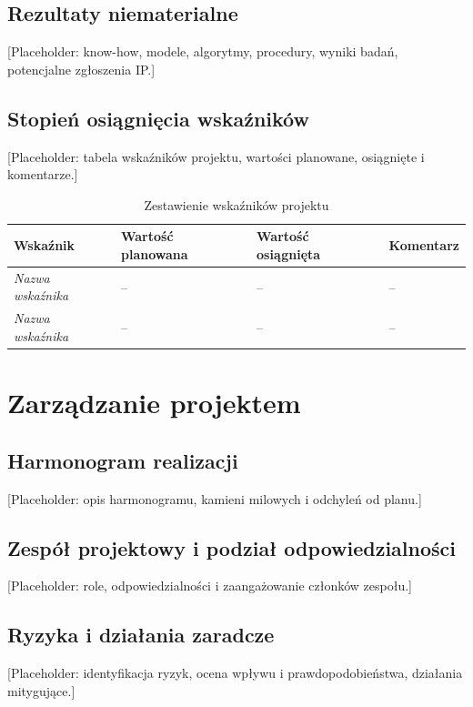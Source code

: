 \documentclass[12pt,a4paper]{report}
\begin{document}
\section{Rezultaty niematerialne}
[Placeholder: know-how, modele, algorytmy, procedury, wyniki badań, potencjalne zgłoszenia IP.]

\section{Stopień osiągnięcia wskaźników}
[Placeholder: tabela wskaźników projektu, wartości planowane, osiągnięte i komentarze.]

\begin{table}[h]
    \centering
    \caption{Zestawienie wskaźników projektu}
    \begin{tabular}{p{} p{} p{} p{}}
        \toprule
        Wskaźnik & Wartość planowana & Wartość osiągnięta & Komentarz \\
        \midrule
        \textit{Nazwa wskaźnika} & -- & -- & -- \\
        \textit{Nazwa wskaźnika} & -- & -- & -- \\
        \bottomrule
    \end{tabular}
\end{table}

\chapter{Zarządzanie projektem}
\section{Harmonogram realizacji}
[Placeholder: opis harmonogramu, kamieni milowych i odchyleń od planu.]

\section{Zespół projektowy i podział odpowiedzialności}
[Placeholder: role, odpowiedzialności i zaangażowanie członków zespołu.]

\section{Ryzyka i działania zaradcze}
[Placeholder: identyfikacja ryzyk, ocena wpływu i prawdopodobieństwa, działania mitygujące.]
\end{document}
